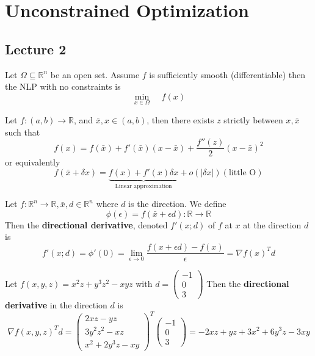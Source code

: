 \section{Unconstrained Optimization}
\subsection{Lecture 2}
\begin{problem}
    Let $\Omega \subseteq \mathbb R^n$ be an open set. Assume $f$ is sufficiently smooth (differentiable) then the NLP with no constraints is $$\min_{x \in \Omega} \;\;\;\; f(x)$$
\end{problem}
\begin{theorem}
    Let $f: (a, b) \rightarrow \mathbb R$, and $\bar{x}, x \in (a,b)$, then there exists $z$ strictly between $x, \bar x$ such that $$f(x) = f(\bar x) + f'(\bar x)(x - \bar x) + \frac{f''(z)}{2}(x - \bar x)^2$$
    or equivalently
    $$f(\bar x + \delta x) = \underbrace{f(x) + f'(x) \delta x}_{\text{Linear approximation}} + o(|\delta x|)(\text{little O})$$
\end{theorem}
\begin{lemma}
    Let $f: \mathbb R^n \rightarrow \mathbb R, \bar x, d \in \mathbb R^n$ where $d$ is the direction. We define
    $$\phi (\epsilon) = f(\bar x + \epsilon d): \mathbb R \rightarrow \mathbb R$$
    Then the \textbf{directional derivative}, denoted $f'(x; d)$ of $f$ at $x$ at the direction $d$ is
    $$f'(x; d) = \phi'(0) = \lim_{\epsilon \rightarrow 0} \frac{f(x + \epsilon d) - f(x)}{\epsilon} = \nabla f(x)^T d$$
\end{lemma}
\begin{problem}
    Let $f(x,y,z) = x^2z + y^3z^2 - xyz$ with $d = \begin{pmatrix}
        -1 \\ 0 \\ 3
    \end{pmatrix}$ Then the \textbf{directional derivative} in the direction $d$ is
    $$\nabla f(x,y,z)^T d = \begin{pmatrix}
        2xz - yz \\
        3y^2z^2 - xz \\
        x^2 + 2y^3z - xy
    \end{pmatrix}^{T} \begin{pmatrix}
        -1 \\ 0 \\ 3
    \end{pmatrix} = -2xz + yz + 3x^2 + 6y^3z - 3xy$$
\end{problem}
